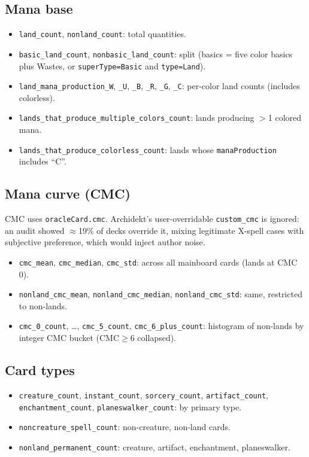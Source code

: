 \documentclass{article}
\begin{document}
\subsection{Mana base}
\label{app:features:mana}
\begin{itemize}\itemsep0pt
  \item \texttt{land\_count}, \texttt{nonland\_count}: total quantities.
  \item \texttt{basic\_land\_count}, \texttt{nonbasic\_land\_count}: split (basics = five color basics plus Wastes, or \texttt{superType=Basic} and \texttt{type=Land}).
  \item \texttt{land\_mana\_production\_W}, \texttt{\_U}, \texttt{\_B}, \texttt{\_R}, \texttt{\_G}, \texttt{\_C}: per-color land counts (includes colorless).
  \item \texttt{lands\_that\_produce\_multiple\_colors\_count}: lands producing $>$1 colored mana.
  \item \texttt{lands\_that\_produce\_colorless\_count}: lands whose \texttt{manaProduction} includes ``C''.
\end{itemize}

\subsection{Mana curve (CMC)}
\label{app:features:curve}
CMC uses \texttt{oracleCard.cmc}. Archidekt's user-overridable \texttt{custom\_cmc} is ignored: an audit showed $\approx$19\% of decks override it, mixing legitimate X-spell cases with subjective preference, which would inject author noise.
\begin{itemize}\itemsep0pt
  \item \texttt{cmc\_mean}, \texttt{cmc\_median}, \texttt{cmc\_std}: across all mainboard cards (lands at CMC 0).
  \item \texttt{nonland\_cmc\_mean}, \texttt{nonland\_cmc\_median}, \texttt{nonland\_cmc\_std}: same, restricted to non-lands.
  \item \texttt{cmc\_0\_count}, \dots, \texttt{cmc\_5\_count}, \texttt{cmc\_6\_plus\_count}: histogram of non-lands by integer CMC bucket (CMC$\geq$6 collapsed).
\end{itemize}

\subsection{Card types}
\label{app:features:types}
\begin{itemize}\itemsep0pt
  \item \texttt{creature\_count}, \texttt{instant\_count}, \texttt{sorcery\_count}, \texttt{artifact\_count}, \texttt{enchantment\_count}, \texttt{planeswalker\_count}: by primary type.
  \item \texttt{noncreature\_spell\_count}: non-creature, non-land cards.
  \item \texttt{nonland\_permanent\_count}: creature, artifact, enchantment, planeswalker.
\end{itemize}
\end{document}
